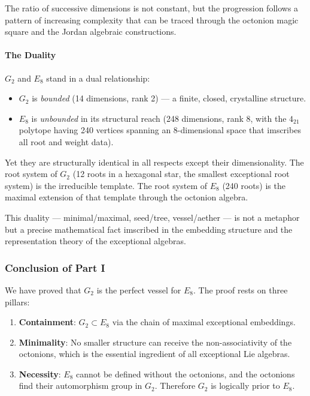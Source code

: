 \documentclass[12pt,a4paper]{article}
\begin{document}
The ratio of successive dimensions is not constant, but the progression follows a pattern of increasing complexity that can be traced through the octonion magic square and the Jordan algebraic constructions.

\paragraph{The Duality}

$G_2$ and $E_8$ stand in a dual relationship:

\begin{itemize}
    \item $G_2$ is \emph{bounded} (14 dimensions, rank 2) --- a finite, closed, crystalline structure.
    \item $E_8$ is \emph{unbounded} in its structural reach (248 dimensions, rank 8, with the $4_{21}$ polytope having 240 vertices spanning an 8-dimensional space that imscribes all root and weight data).
\end{itemize}

Yet they are structurally identical in all respects except their dimensionality. The root system of $G_2$ (12 roots in a hexagonal star, the smallest exceptional root system) is the irreducible template. The root system of $E_8$ (240 roots) is the maximal extension of that template through the octonion algebra.

This duality --- minimal/maximal, seed/tree, vessel/aether --- is not a metaphor but a precise mathematical fact imscribed in the embedding structure and the representation theory of the exceptional algebras.

\subsubsection{Conclusion of Part I}

We have proved that $G_2$ is the perfect vessel for $E_8$. The proof rests on three pillars:

\begin{enumerate}
    \item \textbf{Containment}: $G_2 \subset E_8$ via the chain of maximal exceptional embeddings.
    \item \textbf{Minimality}: No smaller structure can receive the non-associativity of the octonions, which is the essential ingredient of all exceptional Lie algebras.
    \item \textbf{Necessity}: $E_8$ cannot be defined without the octonions, and the octonions find their automorphism group in $G_2$. Therefore $G_2$ is logically prior to $E_8$.
\end{enumerate}
\end{document}
